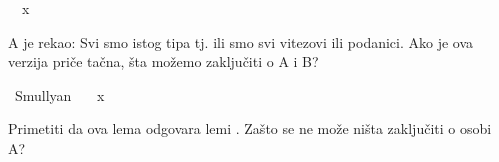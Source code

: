 \begin{isabellebody}
\begin{exercise}[subtitle=Logčki lavirinti.]
\ \ {\isachardoublequoteopen}x{\isachardoublequoteclose}%
\isadelimproof
%
\endisadelimproof
%
\isatagproof
%
\endisatagproof
{\isafoldproof}%
%
\isadelimproof
%
\endisadelimproof
%
\begin{isamarkuptext}%
A je rekao: Svi smo istog tipa tj. 
      ili smo svi vitezovi ili podanici. 
      Ako je ova verzija priče tačna, 
      šta možemo zaključiti o A i B?%
\end{isamarkuptext}\isamarkuptrue%
\isamarkupfalse%
\ Smullyan{\isacharunderscore}{\kern0pt}{}{\isacharunderscore}{\kern0pt}{}{\isacharcolon}{\kern0pt}\ \isanewline
\ \ {\isachardoublequoteopen}x{\isachardoublequoteclose}%
\isadelimproof
%
\endisadelimproof
%
\isatagproof
%
\endisatagproof
{\isafoldproof}%
%
\isadelimproof
%
\endisadelimproof
%
\begin{isamarkuptext}%
Primetiti da ova lema odgovara lemi . 
      Zašto se ne može ništa zaključiti o osobi A?%
\end{isamarkuptext}\isamarkuptrue%
%
\end{exercise}
%
\isadelimtheory
%
\endisadelimtheory
%
\isatagtheory
%
\endisatagtheory
{\isafoldtheory}%
%
\isadelimtheory
%
\endisadelimtheory
%
\end{isabellebody}%
\endinput
